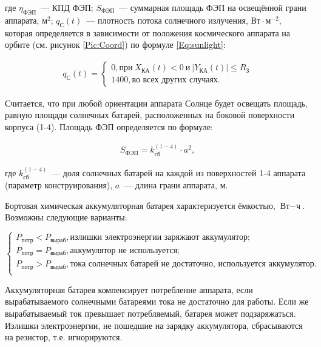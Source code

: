 \documentclass[12pt,a4paper]{article}
\begin{document}
где $\eta_{\text{ФЭП}}$~--- КПД ФЭП; $S_{\text{ФЭП}}$~--- суммарная площадь ФЭП на
освещённой грани аппарата, $\text{м}^2$; $q_{\text{С}}(t)$~--– плотность потока солнечного
излучения, $\text{Вт} \cdot \text{м}^{-2}$, которая определяется в зависимости от положения
космического аппарата на орбите (см. рисунок \ref{Pic:Coord}) по формуле \ref{Eq:sunlight}:

\begin{eqnarray}
  q_{\text{С}}(t) = \left\{
  \begin{array}{l}
    0, \text{при}~X_{\text{КА}}(t) < 0~\text{и}~|Y_{\text{КА}}(t)| \leqslant R_{\text{З}}\\
    1400, \text{во всех других случаях.}
  \end{array}
\right. \label{Eq:sunlight} 
\end{eqnarray}

Считается, что при любой ориентации аппарата Солнце будет освещать площадь, равную площади
солнечных батарей, расположенных на боковой поверхности корпуса (1-4). Площадь ФЭП
определяется по формуле:

\begin{eqnarray}
  S_{\text{ФЭП}} = k^{(1-4)}_{\text{сб}} \cdot a^2, \label{Eq:photopanels}
\end{eqnarray}

где $k^{(1-4)}_{\text{сб}}$~--- доля солнечных батарей на каждой из поверхностей 1-4
аппарата (параметр конструирования), $a$~--– длина грани аппарата, м.

Бортовая химическая аккумуляторная батарея характеризуется ёмкостью, $\text{Вт}-\text{ч}$. Возможны
следующие варианты:

$$
 \left\{
  \begin{array}{l}
    P_{\text{потр}} < P_{\text{выраб}}, \text{излишки электроэнергии заряжают
      аккумулятор};\\
    P_{\text{потр}} = P_{\text{выраб}}, \text{аккумулятор не используется};\\
    P_{\text{потр}} > P_{\text{выраб}}, \text{тока солнечных батарей не достаточно,
      используется аккумулятор}.\\
  \end{array}
\right.
$$

Аккумуляторная батарея компенсирует потребление аппарата, если вырабатываемого солнечными
батареями тока не достаточно для работы. Если же вырабатываемый ток превышает
потребляемый, батарея может подзаряжаться. Излишки электроэнергии, не пошедшие на зарядку
аккумулятора, сбрасываются на резистор, т.е. игнорируются.
\end{document}
